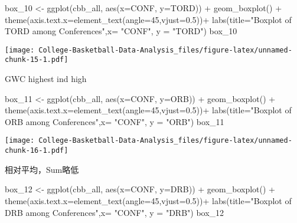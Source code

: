 \documentclass[
]{article}
\newenvironment{Shaded}{\begin{snugshade}}{\end{snugshade}}
\newcommand{\AttributeTok}[1]{\textcolor[rgb]{0.77,0.63,0.00}{#1}}
\newcommand{\DecValTok}[1]{\textcolor[rgb]{0.00,0.00,0.81}{#1}}
\newcommand{\FloatTok}[1]{\textcolor[rgb]{0.00,0.00,0.81}{#1}}
\newcommand{\FunctionTok}[1]{\textcolor[rgb]{0.00,0.00,0.00}{#1}}
\newcommand{\NormalTok}[1]{#1}
\newcommand{\OtherTok}[1]{\textcolor[rgb]{0.56,0.35,0.01}{#1}}
\newcommand{\SpecialCharTok}[1]{\textcolor[rgb]{0.00,0.00,0.00}{#1}}
\newcommand{\StringTok}[1]{\textcolor[rgb]{0.31,0.60,0.02}{#1}}
\begin{document}
\begin{Shaded}
\begin{Highlighting}[]
\NormalTok{box\_10 }\OtherTok{\textless{}{-}} \FunctionTok{ggplot}\NormalTok{(cbb\_all, }\FunctionTok{aes}\NormalTok{(}\AttributeTok{x=}\NormalTok{CONF, }\AttributeTok{y=}\NormalTok{TORD)) }\SpecialCharTok{+} \FunctionTok{geom\_boxplot}\NormalTok{() }\SpecialCharTok{+} \FunctionTok{theme}\NormalTok{(}\AttributeTok{axis.text.x=}\FunctionTok{element\_text}\NormalTok{(}\AttributeTok{angle=}\DecValTok{45}\NormalTok{,}\AttributeTok{vjust=}\FloatTok{0.5}\NormalTok{))}\SpecialCharTok{+} \FunctionTok{labs}\NormalTok{(}\AttributeTok{title=}\StringTok{"Boxplot of TORD among Conferences"}\NormalTok{,}\AttributeTok{x=} \StringTok{"CONF"}\NormalTok{, }\AttributeTok{y =} \StringTok{"TORD"}\NormalTok{)}
\NormalTok{box\_10}
\end{Highlighting}
\end{Shaded}

\texttt{[image: College-Basketball-Data-Analysis\_files/figure-latex/unnamed-chunk-15-1.pdf]}

GWC highest ind high

\begin{Shaded}
\begin{Highlighting}[]
\NormalTok{box\_11 }\OtherTok{\textless{}{-}} \FunctionTok{ggplot}\NormalTok{(cbb\_all, }\FunctionTok{aes}\NormalTok{(}\AttributeTok{x=}\NormalTok{CONF, }\AttributeTok{y=}\NormalTok{ORB)) }\SpecialCharTok{+} \FunctionTok{geom\_boxplot}\NormalTok{() }\SpecialCharTok{+} \FunctionTok{theme}\NormalTok{(}\AttributeTok{axis.text.x=}\FunctionTok{element\_text}\NormalTok{(}\AttributeTok{angle=}\DecValTok{45}\NormalTok{,}\AttributeTok{vjust=}\FloatTok{0.5}\NormalTok{))}\SpecialCharTok{+} \FunctionTok{labs}\NormalTok{(}\AttributeTok{title=}\StringTok{"Boxplot of ORB among Conferences"}\NormalTok{,}\AttributeTok{x=} \StringTok{"CONF"}\NormalTok{, }\AttributeTok{y =} \StringTok{"ORB"}\NormalTok{)}
\NormalTok{box\_11}
\end{Highlighting}
\end{Shaded}

\texttt{[image: College-Basketball-Data-Analysis\_files/figure-latex/unnamed-chunk-16-1.pdf]}

相对平均，Sum略低

\begin{Shaded}
\begin{Highlighting}[]
\NormalTok{box\_12 }\OtherTok{\textless{}{-}} \FunctionTok{ggplot}\NormalTok{(cbb\_all, }\FunctionTok{aes}\NormalTok{(}\AttributeTok{x=}\NormalTok{CONF, }\AttributeTok{y=}\NormalTok{DRB)) }\SpecialCharTok{+} \FunctionTok{geom\_boxplot}\NormalTok{() }\SpecialCharTok{+} \FunctionTok{theme}\NormalTok{(}\AttributeTok{axis.text.x=}\FunctionTok{element\_text}\NormalTok{(}\AttributeTok{angle=}\DecValTok{45}\NormalTok{,}\AttributeTok{vjust=}\FloatTok{0.5}\NormalTok{))}\SpecialCharTok{+} \FunctionTok{labs}\NormalTok{(}\AttributeTok{title=}\StringTok{"Boxplot of DRB among Conferences"}\NormalTok{,}\AttributeTok{x=} \StringTok{"CONF"}\NormalTok{, }\AttributeTok{y =} \StringTok{"DRB"}\NormalTok{)}
\NormalTok{box\_12}
\end{Highlighting}
\end{Shaded}
\end{document}
